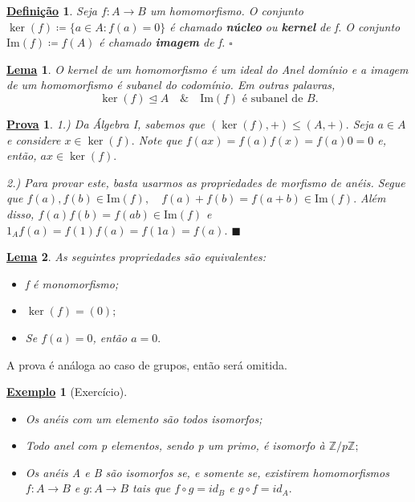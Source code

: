 \documentclass{article}
\newtheorem*{def*}{\underline{Defini\c c\~ao}}
\newtheorem*{lemma*}{\underline{Lema}}
\newtheorem{example}{\underline{Exemplo}}
\newtheorem*{proof*}{\underline{Prova}}
\renewcommand\qedsymbol{$\blacksquare$}
\begin{document}
\begin{def*}
  Seja \(f:A\rightarrow B\) um homomorfismo. O conjunto \(\ker{(f)}\coloneqq \{a\in A: f(a) = 0\}\)
é chamado \textbf{núcleo} ou \textbf{kernel} de f. O conjunto \(\mathrm{Im}(f)\coloneqq f(A)\) é chamado 
\textbf{imagem} de f. \(\square\)
\end{def*}
\begin{lemma*}
  O kernel de um homomorfismo é um ideal do Anel domínio e a imagem de um homomorfismo é subanel do codomínio. Em outras palavras,
  \[
    \ker{(f)}\trianglelefteq{A}\quad\&\quad \mathrm{Im}(f)\text{ é subanel de }B.
  \]
\end{lemma*}
\begin{proof*}
  1.) Da Álgebra I, sabemos que \((\ker{(f)}, +)\leq (A, +).\) Seja \(a\in A\) e 
considere \(x\in\ker{(f)}.\) Note que \(f(ax) = f(a)f(x) = f(a)0 = 0\) e, então, \(ax\in\ker{(f)}.\)

  2.) Para provar este, basta usarmos as propriedades de morfismo de anéis. Segue que
 \(f(a), f(b)\in \mathrm{Im}(f),\quad f(a) + f(b) = f(a+b)\in \mathrm{Im}(f).\) Além disso,
 \(f(a)f(b) = f(ab)\in \mathrm{Im}(f)\) e \(1_{A}f(a) = f(1)f(a) = f(1a) = f(a).\) \qedsymbol
\end{proof*}
\begin{lemma*}
  As seguintes propriedades são equivalentes:
\begin{itemize}
  \item[1)] f é monomorfismo;
  \item[2)] \(\ker{(f)} = (0);\)
  \item[3)] Se \(f(a) = 0\), então \(a=0.\)
\end{itemize}
\end{lemma*}
  A prova é análoga ao caso de grupos, então será omitida.
\begin{example}[Exercício]
 \begin{itemize}
  \item[1)] Os anéis com um elemento são todos isomorfos;
  \item[2)] Todo anel com p elementos, sendo p um primo, é isomorfo à \(\mathbb{Z}/p \mathbb{Z};\)
  \item[3)] Os anéis A e B são isomorfos se, e somente se, existirem homomorfismos
\(f:A\rightarrow B\) e \(g:A\rightarrow B\) tais que \(f\circ{g}=id_{B}\) e \(g\circ{f} = id_{A}.\)
 \end{itemize} 
\end{example}
\end{document}
